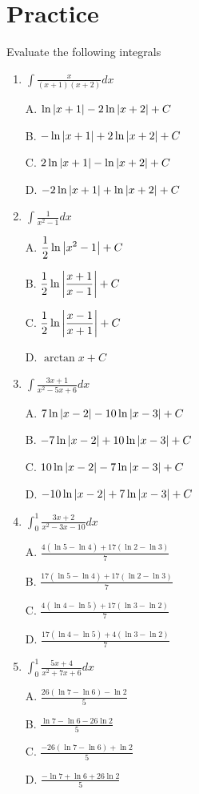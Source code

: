 \documentclass{article}
\numberwithin{equation}{section}
\begin{document}
\section{Practice}
Evaluate the following integrals
\begin{enumerate}
    \item $\displaystyle \int \frac{x}{(x+1)(x+2)} dx$
    
    A. $\ln \abs{x+1} - 2 \ln \abs{x+2} +C$

    B. $-\ln \abs{x+1} + 2\ln \abs{x+2} +C$

    C. $2\ln \abs{x+1} - \ln\abs{x+2} +C$

    D. $-2\ln \abs{x+1} + \ln \abs{x+2} +C$

    \item $\displaystyle \int \frac{1}{x^2-1} dx$
    
    A. $\displaystyle \frac{1}{2} \ln \abs{x^2-1} +C$
    
    B. $\displaystyle \frac{1}{2}\ln \abs{\frac{x+1}{x-1}}+C$

    C. $\displaystyle \frac{1}{2}\ln \abs{\frac{x-1}{x+1}} +C$

    D. $\displaystyle \arctan x + C$

    \item $\displaystyle \int \frac{3x+1}{x^2-5x+6} dx$
    
    A. $7 \ln \abs{x-2} - 10\ln \abs{x-3}+C$

    B. $-7 \ln \abs{x-2} +10\ln \abs{x-3}+C$

    C. $10 \ln \abs{x-2} - 7 \ln \abs{x-3}+C$

    D. $-10 \ln \abs{x-2} + 7 \ln \abs{x-3} +C$

    \item $\displaystyle \int_{0}^{1} \frac{3x+2}{x^2 -3x-10}dx$
    
    A. $\displaystyle \frac{4(\ln 5 - \ln 4) + 17 (\ln 2 - \ln 3)}{7}$

    B. $\displaystyle \frac{17(\ln 5 - \ln 4) + 17 (\ln 2- \ln 3)}{7}$

    C. $\displaystyle\frac{4(\ln 4 -\ln 5) + 17 (\ln 3 - \ln 2)}{7}$

    D. $\displaystyle \frac{17(\ln 4 - \ln 5) + 4(\ln 3 - \ln 2)}{7}$

    \item $\displaystyle \int_{0}^{1} \frac{5x + 4}{x^2 + 7x + 6}dx$
    
    A. $\displaystyle \frac{26(\ln7 - \ln 6) - \ln 2}{5}$

    B. $\displaystyle \frac{\ln 7 - \ln 6 - 26 \ln 2}{5}$

    C. $\displaystyle \frac{-26(\ln 7 - \ln 6) + \ln 2}{5}$

    D. $\displaystyle \frac{-\ln 7 + \ln 6 + 26\ln 2}{5}$
\end{enumerate}
\end{document}
